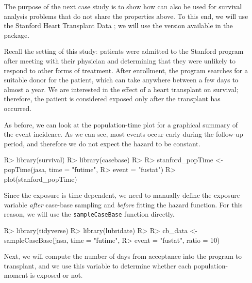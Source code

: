 \documentclass[
]{jss}
\begin{document}
The purpose of the next case study is to show how  can
also be used for survival analysis problems that do not share the
properties above. To this end, we will use the Stanford Heart Transplant
Data \citep[\citet{crowley1977covariance}]{clark1971cardiac}; we will
use the version available in the  package.

Recall the setting of this study: patients were admitted to the Stanford
program after meeting with their physician and determining that they
were unlikely to respond to other forms of treatment. After enrollment,
the program searches for a suitable donor for the patient, which can
take anywhere between a few days to almost a year. We are interested in
the effect of a heart transplant on survival; therefore, the patient is
considered exposed only after the transplant has occurred.

As before, we can look at the population-time plot for a graphical
summary of the event incidence. As we can see, most events occur early
during the follow-up period, and therefore we do not expect the hazard
to be constant.

\begin{CodeChunk}

\begin{CodeInput}
R> library(survival)
R> library(casebase)
R> 
R> stanford_popTime <- popTime(jasa, time = "futime", 
R>                             event = "fustat")
R> plot(stanford_popTime)
\end{CodeInput}
\end{CodeChunk}

Since the exposure is time-dependent, we need to manually define the
exposure variable \emph{after} case-base sampling and \emph{before}
fitting the hazard function. For this reason, we will use the
\texttt{sampleCaseBase} function directly.

\begin{CodeChunk}

\begin{CodeInput}
R> library(tidyverse)
R> library(lubridate)
R> 
R> cb_data <- sampleCaseBase(jasa, time = "futime", 
R>                           event = "fustat", ratio = 10)
\end{CodeInput}
\end{CodeChunk}

Next, we will compute the number of days from acceptance into the
program to transplant, and we use this variable to determine whether
each population-moment is exposed or not.
\end{document}
